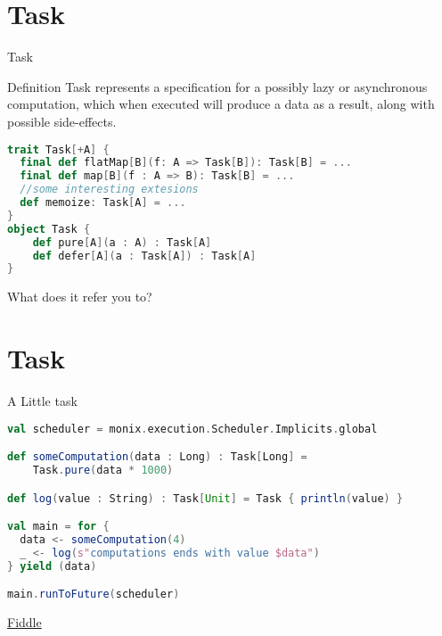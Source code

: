\documentclass[presentation]{beamer}
\begin{document}
\section{Task}
\begin{frame}[fragile]{Task}

\begin{block}{Definition}
  Task represents a specification for a possibly lazy or asynchronous computation, which when executed will produce a data as a result, along with possible side-effects.
\end{block}
\begin{lstlisting}[language=Scala]
trait Task[+A] {
  final def flatMap[B](f: A => Task[B]): Task[B] = ...
  final def map[B](f : A => B): Task[B] = ...
  //some interesting extesions
  def memoize: Task[A] = ...
}
object Task {
    def pure[A](a : A) : Task[A]
    def defer[A](a : Task[A]) : Task[A]
}
\end{lstlisting}
\begin{center}
  What does it refer you to?
\end{center}

\end{frame}

\section{Task}
\begin{frame}[fragile]{A Little task}

\begin{lstlisting}[language=Scala]
val scheduler = monix.execution.Scheduler.Implicits.global

def someComputation(data : Long) : Task[Long] = 
    Task.pure(data * 1000)

def log(value : String) : Task[Unit] = Task { println(value) }

val main = for {
  data <- someComputation(4)
  _ <- log(s"computations ends with value $data")
} yield (data)

main.runToFuture(scheduler)
\end{lstlisting}
\begin{center}
  \href{https://scalafiddle.io/sf/C4Qon6a/1}{Fiddle}
\end{center}

\end{frame}
\end{document}
